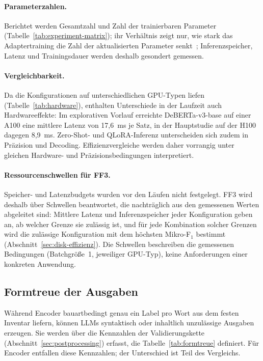 \paragraph{Parameterzahlen.}
Berichtet werden Gesamtzahl und Zahl der trainierbaren Parameter
(Tabelle~\ref{tab:experiment-matrix}); ihr Verhältnis zeigt nur, wie stark das
Adaptertraining die Zahl der aktualisierten Parameter
senkt~\cite{hu2021lora,dettmers2023qlora}; Inferenzspeicher, Latenz und
Trainingsdauer werden deshalb gesondert gemessen.


\paragraph{Vergleichbarkeit.}
Da die Konfigurationen auf unterschiedlichen GPU-Typen liefen
(Tabelle~\ref{tab:hardware}), enthalten Unterschiede in der Laufzeit
auch Hardwareeffekte: Im explorativen Vorlauf erreichte DeBERTa-v3-base
auf einer A100 eine mittlere Latenz von 17,6~ms je Satz, in der
Hauptstudie auf der H100 dagegen 8,9~ms.
Zero-Shot- und QLoRA-Inferenz unterscheiden sich zudem in Präzision und
Decoding.
Effizienzvergleiche werden daher vorrangig unter gleichen Hardware-
und Präzisionsbedingungen interpretiert.

\paragraph{Ressourcenschwellen für FF3.}
Speicher- und Latenzbudgets wurden vor den Läufen nicht festgelegt.
FF3 wird deshalb über Schwellen beantwortet, die nachträglich aus den
gemessenen Werten abgeleitet sind: Mittlere Latenz und Inferenzspeicher
jeder Konfiguration geben an, ab welcher Grenze sie zulässig ist, und für
jede Kombination solcher Grenzen wird die zulässige Konfiguration mit dem
höchsten Mikro-F$_1$ bestimmt (Abschnitt~\ref{sec:disk-effizienz}).
Die Schwellen beschreiben die gemessenen Bedingungen (Batchgröße~1,
jeweiliger GPU-Typ), keine Anforderungen einer konkreten Anwendung.

\subsection{Formtreue der Ausgaben}
\label{sec:robustheit-ausgaben}

Während Encoder bauartbedingt genau ein Label pro Wort aus dem festen
Inventar liefern, können LLMs syntaktisch oder inhaltlich unzulässige
Ausgaben erzeugen.
Sie werden über die Kennzahlen der Validierungskette
(Abschnitt~\ref{sec:postprocessing}) erfasst, die
Tabelle~\ref{tab:formtreue} definiert.
Für Encoder entfallen diese Kennzahlen; der Unterschied ist Teil des
Vergleichs.

